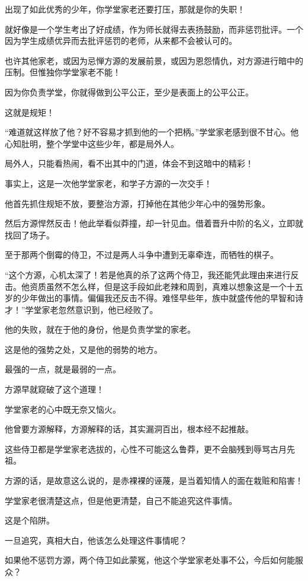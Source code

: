 \begin{this_body}
出现了如此优秀的少年，你学堂家老还要打压，那就是你的失职！

就好像是一个学生考出了好成绩，作为师长就得去表扬鼓励，而非惩罚批评。一个因为学生成绩优异而去批评惩罚的老师，从来都不会被认可的。

也许其他家老，或因为忌惮方源的发展前景，或因为恩怨情仇，对方源进行暗中的压制。但惟独你学堂家老不能！

因为你负责学堂，你就得做到公平公正，至少是表面上的公平公正。

这就是规矩！

“难道就这样放了他？好不容易才抓到他的一个把柄。”学堂家老感到很不甘心。他心知肚明，整个学堂中这些少年，都是局外人。

局外人，只能看热闹，看不出其中的门道，体会不到这暗中的精彩！

事实上，这是一次他学堂家老，和学子方源的一次交手！

他首先抓住规矩不放，要整治方源，打掉他在其他少年心中的强势形象。

然后方源悍然反击！他此举看似莽撞，却一针见血。借着晋升中阶的名义，立即就找回了场子。

至于那两个倒霉的侍卫，不过是两人斗争中遭到无辜牵连，而牺牲的棋子。

“这个方源，心机太深了！若是他真的杀了这两个侍卫，我还能凭此理由来进行反击。他资质虽然不怎么样，但是这手段如此老辣和周到，真难以想象这是一个十五岁的少年做出的事情。偏偏我还反击不得。难怪早些年，族中就盛传他的早智和诗才！”学堂家老忽然意识到，他已经败了。

他的失败，就在于他的身份，他是负责学堂的家老。

这是他的强势之处，又是他的弱势的地方。

最强的一点，就是最弱的一点。

方源早就窥破了这个道理！

学堂家老的心中既无奈又恼火。

他曾要方源解释，方源解释的话，其实漏洞百出，根本经不起推敲。

这些侍卫都是学堂家老选拔的，心性不可能这么鲁莽，更不会脑残到辱骂古月先祖。

方源的话，是故意这么说的，是赤裸裸的诬蔑，是当着知情人的面在栽赃和陷害！

学堂家老很清楚这点，但是他更清楚，自己不能追究这件事情。

这是个陷阱。

一旦追究，真相大白，他该怎么处理这件事情呢？

如果他不惩罚方源，两个侍卫如此蒙冤，他这个学堂家老处事不公，今后如何能服众？


\end{this_body}

